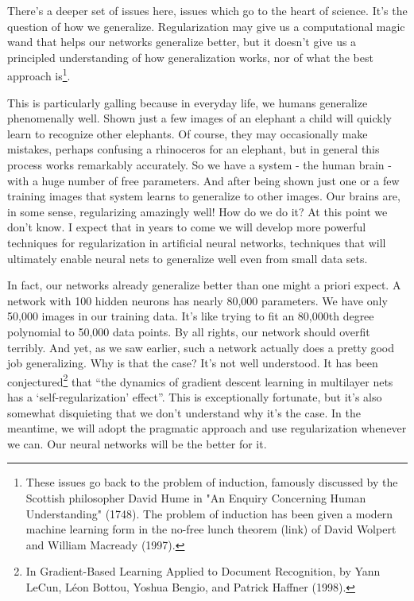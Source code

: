 \documentclass[a4paper,twoside,10pt]{book}
\begin{document}
There's a deeper set of issues here, issues which go to the heart of science. It's the question of how we generalize. Regularization may give us a computational magic wand that helps our networks generalize better, but it doesn't give us a principled understanding of how generalization works, nor of what the best approach is\footnote{These issues go back to the problem of induction, famously discussed by the Scottish philosopher David Hume in "An Enquiry Concerning Human Understanding" (1748). The problem of induction has been given a modern machine learning form in the no-free lunch theorem (link) of David Wolpert and William Macready (1997).}.

This is particularly galling because in everyday life, we humans generalize phenomenally well. Shown just a few images of an elephant a child will quickly learn to recognize other elephants. Of course, they may occasionally make mistakes, perhaps confusing a rhinoceros for an elephant, but in general this process works remarkably accurately. So we have a system - the human brain - with a huge number of free parameters. And after being shown just one or a few training images that system learns to generalize to other images. Our brains are, in some sense, regularizing amazingly well! How do we do it? At this point we don't know. I expect that in years to come we will develop more powerful techniques for regularization in artificial neural networks, techniques that will ultimately enable neural nets to generalize well even from small data sets.

In fact, our networks already generalize better than one might a priori expect. A network with 100 hidden neurons has nearly 80,000 parameters. We have only 50,000 images in our training data. It's like trying to fit an 80,000th degree polynomial to 50,000 data points. By all rights, our network should overfit terribly. And yet, as we saw earlier, such a network actually does a pretty good job generalizing. Why is that the case? It's not well understood. It has been conjectured\footnote{In Gradient-Based Learning Applied to Document Recognition, by Yann LeCun, L\'{e}on Bottou, Yoshua Bengio, and Patrick Haffner (1998).} that ``the dynamics of gradient descent learning in multilayer nets has a `self-regularization' effect''. This is exceptionally fortunate, but it's also somewhat disquieting that we don't understand why it's the case. In the meantime, we will adopt the pragmatic approach and use regularization whenever we can. Our neural networks will be the better for it.
\end{document}
